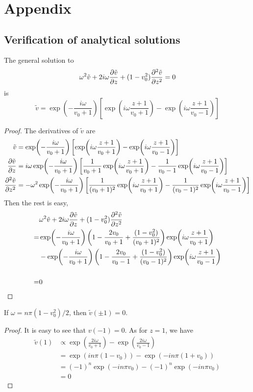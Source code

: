 \chapter*{Appendix}
\section*{Verification of analytical solutions}
\begin{theorem}
    The general solution to 
    \[
        \omega^2\tilde{v} + 2i\omega\pdv{\tilde{v}}{z} + (1-v_0^2)\pdv[2]{\tilde{v}}{z} = 0
    \]
    is 
    \[ 
        \tilde{v} = \exp(-\frac{i\omega}{v_0+1})
        \left[ \exp(i\omega\frac{z+1}{v_0+1}) 
        - \exp(i\omega\frac{z+1}{v_0-1}) \right]
    \]
\end{theorem}
\begin{proof}
    The derivatives of $\tilde{v}$ are 
    \begin{align*}
        \tilde{v} &= \exp(-\frac{i\omega}{v_0+1})
        \left[ \exp(i\omega\frac{z+1}{v_0+1}) 
        - \exp(i\omega\frac{z+1}{v_0-1}) \right] \\
        \pdv{\tilde{v}}{z} &= i\omega\exp(-\frac{i\omega}{v_0+1})
        \left[ \frac{1}{v_0+1}\exp(i\omega\frac{z+1}{v_0+1}) - \frac{1}{v_0-1}\exp(i\omega\frac{z+1}{v_0-1}) \right] \\
        \pdv[2]{\tilde{v}}{z} &= -\omega^2\exp(-\frac{i\omega}{v_0+1})
        \left[ \frac{1}{(v_0+1)^2}\exp(i\omega\frac{z+1}{v_0+1}) - \frac{1}{(v_0-1)^2}\exp(i\omega\frac{z+1}{v_0-1}) \right]
    \end{align*}
    Then the rest is easy,
    \begin{align*}
        &\omega^2\tilde{v} + 2i\omega\pdv{\tilde{v}}{z} + (1-v_0^2)\pdv[2]{\tilde{v}}{z} \\
        =& \exp(-\frac{i\omega}{v_0+1})
            \left(1-\frac{2v_0}{v_0+1} + \frac{(1-v_0^2)}{(v_0+1)^2}\right)\exp(i\omega\frac{z+1}{v_0+1})
        \\
        &-\exp(-\frac{i\omega}{v_0+1})\left(1-\frac{2v_0}{v_0-1} + \frac{(1-v_0^2)}{(v_0-1)^2}\right)\exp(i\omega\frac{z+1}{v_0-1}) \\
        \\
        =& 0
    \end{align*}
\end{proof}

\begin{theorem}
    If $\omega = n\pi(1-v_0^2)/2$, then $\tilde{v}(\pm 1) = 0$.
\end{theorem}
\begin{proof}
    It is easy to see that $v(-1)=0$. As for $z=1$, we have
    \begin{align*}
        \tilde{v}(1) &\propto
        \exp(\frac{2i\omega}{v_0+1}) - \exp(\frac{2i\omega}{v_0-1}) \\
        &=
        \exp(in\pi(1-v_0)) - \exp(-in\pi(1+v_0)) \\
        &=
        (-1)^n\exp(-in\pi v_0) - (-1)^n\exp(-in\pi v_0) \\
        &= 0
    \end{align*}
\end{proof}

